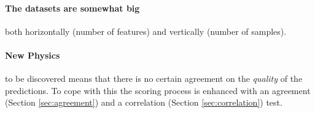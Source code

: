 \documentclass[11pt]{article}
\begin{document}
\paragraph{The datasets are somewhat big} both horizontally (number of features)
and vertically (number of samples).
\paragraph{New Physics} to be discovered means that there is no certain
agreement on the \textit{quality} of the predictions. To cope with this the
scoring process is enhanced with an agreement (Section \ref{sec:agreement}) and
a correlation (Section \ref{sec:correlation}) test.
\end{document}
